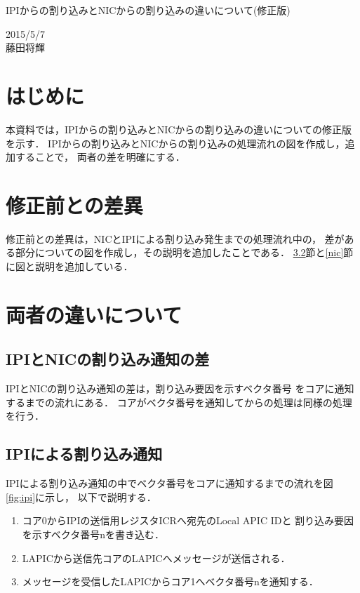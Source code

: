 \documentclass[12pt]{jsarticle}
\begin{document}

\begin{center}
{\LARGE IPIからの割り込みとNICからの割り込みの違いについて(修正版)}
\end{center}

\begin{flushright}
  2015/5/7\\
  藤田将輝
\end{flushright}
\section{はじめに}
本資料では，IPIからの割り込みとNICからの割り込みの違いについての修正版を示す．
IPIからの割り込みとNICからの割り込みの処理流れの図を作成し，追加することで，
両者の差を明確にする．
\section{修正前との差異}
修正前との差異は，NICとIPIによる割り込み発生までの処理流れ中の，
差がある部分についての図を作成し，その説明を追加したことである．
\ref{ipi}節と\ref{nic}節に図と説明を追加している．
\section{両者の違いについて}
\subsection{IPIとNICの割り込み通知の差}
IPIとNICの割り込み通知の差は，割り込み要因を示すベクタ番号
をコアに通知するまでの流れにある．
コアがベクタ番号を通知してからの処理は同様の処理を行う．
\subsection{IPIによる割り込み通知}\label{ipi}
IPIによる割り込み通知の中でベクタ番号をコアに通知するまでの流れを図\ref{fig:ipi}に示し，
以下で説明する．
        \begin{enumerate}
            \item コア0からIPIの送信用レジスタICRへ宛先のLocal APIC IDと
                割り込み要因を示すベクタ番号nを書き込む．
            \item LAPICから送信先コアのLAPICへメッセージが送信される．
            \item メッセージを受信したLAPICからコア1へベクタ番号nを通知する．
        \end{enumerate}
\end{document}
